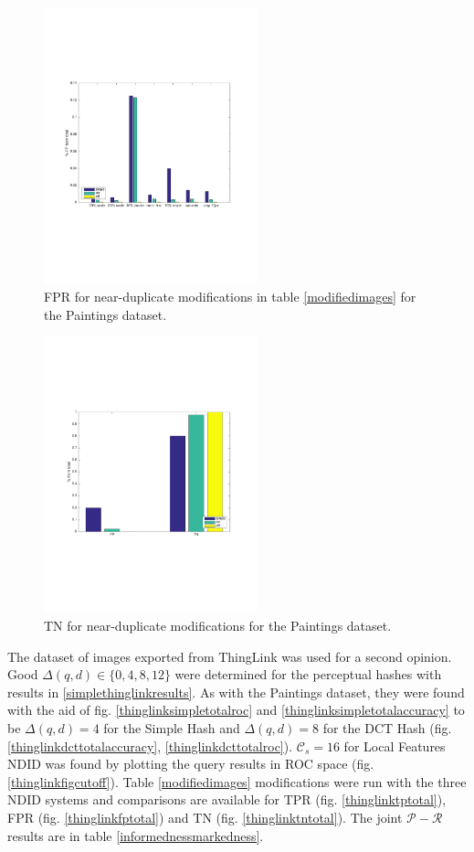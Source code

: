 \documentclass[english,12pt,a4paper,pdftex,elec,utf8, table]{aaltothesis}
\begin{document}
\begin{figure}[htb]
\begin{center}
\includegraphics[height=8cm]{figures/fpBar}
\end{center}
\caption{ FPR for near-duplicate modifications in table \ref{modifiedimages} for the Paintings dataset.}
\label{fptotal}
\end{figure}

\begin{figure}[htb]
\begin{center}
\includegraphics[height=8cm]{figures/tnBar}
\end{center}
\caption{ TN for near-duplicate modifications for the Paintings dataset.}
\label{tntotal}
\end{figure}

The dataset of images exported from ThingLink was used for a second opinion. Good $\Delta(q,d) \in \{0,4,8,12\}$ were determined for the perceptual hashes with results in \ref{simplethinglinkresults}. As with the Paintings dataset, they were found with the aid of fig. \ref{thinglinksimpletotalroc} and \ref{thinglinksimpletotalaccuracy} to be $\Delta(q,d)=4$ for the Simple Hash and $\Delta(q,d)=8$ for the DCT Hash (fig. \ref{thinglinkdcttotalaccuracy}, \ref{thinglinkdcttotalroc}). $\mathcal{C}_s=16$ for Local Features NDID was found by plotting the query results in ROC space (fig. \ref{thinglinkfigcutoff}). Table \ref{modifiedimages} modifications were run with the three NDID systems and comparisons are available for TPR (fig. \ref{thinglinktptotal}), FPR (fig. \ref{thinglinkfptotal}) and TN (fig. \ref{thinglinktntotal}). The joint $\mathcal{P}-\mathcal{R}$ results are in table \ref{informednessmarkedness}.
\end{document}
